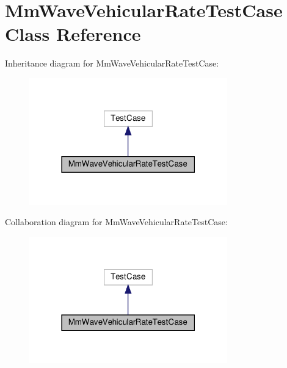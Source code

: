 \hypertarget{classMmWaveVehicularRateTestCase}{}\section{Mm\+Wave\+Vehicular\+Rate\+Test\+Case Class Reference}
\label{classMmWaveVehicularRateTestCase}


Inheritance diagram for Mm\+Wave\+Vehicular\+Rate\+Test\+Case\+:\nopagebreak
\begin{figure}[H]
\begin{center}
\leavevmode
\includegraphics[width=243pt]{classMmWaveVehicularRateTestCase__inherit__graph}
\end{center}
\end{figure}


Collaboration diagram for Mm\+Wave\+Vehicular\+Rate\+Test\+Case\+:\nopagebreak
\begin{figure}[H]
\begin{center}
\leavevmode
\includegraphics[width=243pt]{classMmWaveVehicularRateTestCase__coll__graph}
\end{center}
\end{figure}
